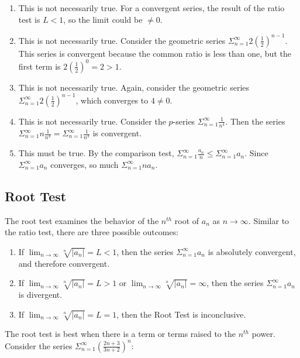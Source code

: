 \begin{Answer}[ref=label2]
\begin{enumerate}
\item This is not necessarily true. For a convergent series, the result of the 
ratio test is $L < 1$, so the limit could be $\neq 0$. 
\item This is not necessarily true. Consider the geometric series $\Sigma_{n=1}
^\infty 2(\frac{1}{2})^{n-1}$. This series is convergent because the common 
ratio is less than one, but the first term is $2(\frac{1}{2})^0 = 2 > 1$. 
\item This is not necessarily true. Again, consider the geometric series 
$\Sigma_{n=1}^\infty 2(\frac{1}{2})^{n-1}$, which converges to $4 \neq 0$. 
\item This is not necessarily true. Consider the $p$-series $\Sigma_{n=1}^
\infty \frac{1}{n^4}$. Then the series $\Sigma_{n=1}^\infty n \frac{1}{n^4} = 
\Sigma_{n=1}^\infty \frac{1}{n^3}$ is convergent. 
\item This must be true. By the comparison test, $\Sigma_{n=1}^\infty 
\frac{a_n}{n} \leq \Sigma_{n = 1}^\infty a_n$. Since $\Sigma_{n = 1}^\infty 
a_n$ converges, so much $\Sigma_{n = 1}^\infty na_n$. 
\end{enumerate}
\end{Answer}

\subsection{Root Test}
The root test examines the behavior of the $n^{th}$ root of $a_n$ as $n \to 
\infty$. Similar to the ratio test, there are three possible outcomes:
\begin{enumerate}
\item If $\lim_{n \to \infty} \sqrt[n]{|a_n|} = L < 1$, then the series $\Sigma
_{n=1}^\infty a_n$ is absolutely convergent, and therefore convergent.
\item If $\lim_{n \to \infty} \sqrt[n]{|a_n|} = L >1$ or $\lim_{n \to \infty} 
\sqrt[n]{|a_n|} = \infty$, then the series $\Sigma_{n=1}^\infty a_n$ is 
divergent.
\item If $\lim_{n \to \infty} \sqrt[n]{|a_n|} = L = 1$, then the Root Test is 
inconclusive. 
\end{enumerate}

The root test is best when there is a term or terms raised to the $n^{th}$ 
power. Consider the series $\Sigma_{n=1}^\infty \left( \frac{2n + 3}{3n + 2} 
\right)^n$:


